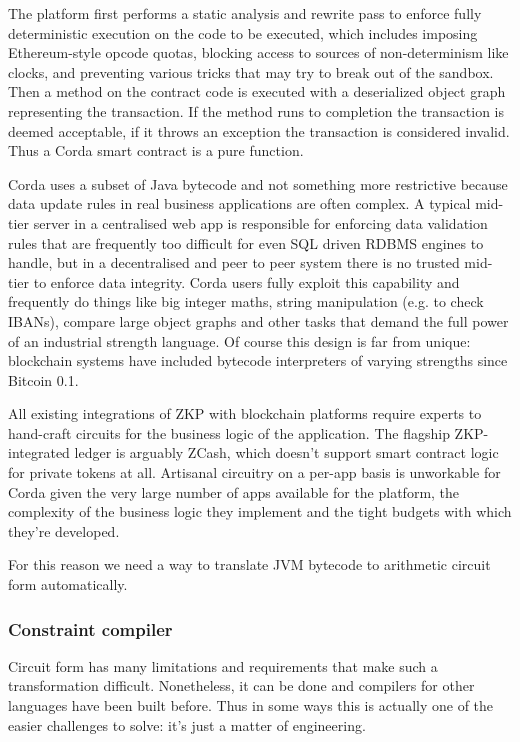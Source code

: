 \documentclass{article}
\begin{document}
The platform first performs a static analysis and rewrite pass to enforce fully deterministic execution on the code
to be executed, which includes imposing Ethereum-style opcode quotas, blocking access to sources of non-determinism
like clocks, and preventing various tricks that may try to break out of the sandbox. Then a method on the contract
code is executed with a deserialized object graph representing the transaction. If the method runs to
completion the transaction is deemed acceptable, if it throws an exception the transaction is considered invalid.
Thus a Corda smart contract is a pure function.

Corda uses a subset of Java bytecode and not something more restrictive because data update rules in real business
applications are often complex. A typical mid-tier server in a centralised web app is responsible for enforcing
data validation rules that are frequently too difficult for even SQL driven RDBMS engines to handle, but in a
decentralised and peer to peer system there is no trusted mid-tier to enforce data integrity. Corda users fully
exploit this capability and frequently do things like big integer maths, string manipulation (e.g. to check IBANs),
compare large object graphs and other tasks that demand the full power of an industrial
strength language. Of course this design is far from unique: blockchain systems have included bytecode interpreters
of varying strengths since Bitcoin 0.1.

All existing integrations of ZKP with blockchain platforms require experts to hand-craft circuits for the
business logic of the application. The flagship ZKP-integrated ledger is arguably ZCash, which doesn't support
smart contract logic for private tokens at all. Artisanal circuitry on a per-app basis is unworkable for Corda
given the very large number of apps available for the platform, the complexity of the business logic they
implement and the tight budgets with which they're developed.

For this reason we need a way to translate JVM bytecode to arithmetic circuit form automatically.

\subsubsection{Constraint compiler}

Circuit form has many limitations and requirements that make such a transformation difficult. Nonetheless, it can
be done and compilers for other languages have been built before. Thus in some ways this is actually one of the
easier challenges to solve: it's just a matter of engineering.
\end{document}
